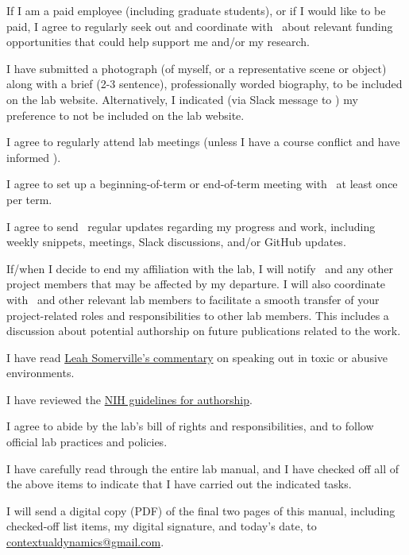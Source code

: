 \documentclass{tufte-book} %
\begin{document}
\begin{todolist}
    \item If I am a paid employee (including graduate students), or if
      I would like to be paid, I agree to regularly seek out and
      coordinate with \director~about relevant funding opportunities
      that could help support me and/or my research.
  \item I have submitted a photograph (of myself, or a representative
    scene or object) along with a brief (2-3 sentence), professionally
    worded biography, to be included on the lab website.
    Alternatively, I indicated (via Slack message to \coordinator) my
    preference to not be included on the lab website.
  \item I agree to regularly attend lab meetings (unless I have a
    course conflict and have informed \director).
  \item I agree to set up a beginning-of-term or end-of-term meeting
    with \director~at least once per term.
    \item I agree to send \director~regular updates regarding my
      progress and work, including weekly snippets, meetings, Slack
      discussions, and/or GitHub updates.
      \item If/when I decide to end my affiliation with the lab, I
        will notify \director~and any other project members that may
        be affected by my departure.  I will also coordinate with
        \director~and other relevant lab members to facilitate a smooth
        transfer of your project-related roles and responsibilities to
        other lab members.  This includes a discussion about potential
        authorship on future publications related to the work.
  \item I have read
    \href{https://www.sciencemag.org/careers/2018/11/what-can-we-learn-dartmouth}{Leah
      Somerville's commentary} on speaking out in toxic or abusive
    environments.
  \item I have reviewed the
    \href{https://oir.nih.gov/sites/default/files/uploads/sourcebook/documents/ethical_conduct/guidelines-authorship_contributions.pdf}{NIH
      guidelines for authorship}.
  \item I agree to abide by the lab's bill of rights and
    responsibilities, and to follow official lab practices and
    policies.
  \item I have carefully read through the entire lab manual, and I
    have checked off all of the above items to indicate that I have
    carried out the indicated tasks.
  \item I will send a digital copy (PDF) of the final two pages of
    this manual, including checked-off list items, my digital
    signature, and today's date, to
    \href{mailto:contextualdynamics@gmail.com}{contextualdynamics@gmail.com}.
\end{todolist}
\end{document}
